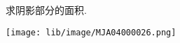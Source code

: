 求阴影部分的面积.

\begin{flushright}

    \texttt{[image: lib/image/MJA04000026.png]}

\end{flushright}



